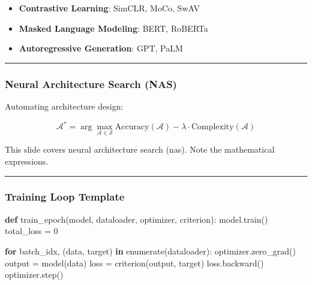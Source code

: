 \documentclass[
  letterpaper,
  DIV=11,
  numbers=noendperiod]{scrartcl}
\newenvironment{Shaded}{\begin{snugshade}}{\end{snugshade}}
\newcommand{\BuiltInTok}[1]{\textcolor[rgb]{0.00,0.23,0.31}{#1}}
\newcommand{\ControlFlowTok}[1]{\textcolor[rgb]{0.00,0.23,0.31}{\textbf{#1}}}
\newcommand{\DecValTok}[1]{\textcolor[rgb]{0.68,0.00,0.00}{#1}}
\newcommand{\KeywordTok}[1]{\textcolor[rgb]{0.00,0.23,0.31}{\textbf{#1}}}
\newcommand{\NormalTok}[1]{\textcolor[rgb]{0.00,0.23,0.31}{#1}}
\newcommand{\OperatorTok}[1]{\textcolor[rgb]{0.37,0.37,0.37}{#1}}
\providecommand{\tightlist}{%
  \setlength{\itemsep}{0pt}\setlength{\parskip}{0pt}}
\begin{document}
\begin{itemize}
\tightlist
\item
  \textbf{Contrastive Learning}: SimCLR, MoCo, SwAV
\item
  \textbf{Masked Language Modeling}: BERT, RoBERTa
\item
  \textbf{Autoregressive Generation}: GPT, PaLM
\end{itemize}

\begin{center}\rule{0.5\linewidth}{0.5pt}\end{center}

\subsubsection{Neural Architecture Search
(NAS)}\label{neural-architecture-search-nas}

Automating architecture design:

\[\mathcal{A}^* = \arg\max_{\mathcal{A} \in \mathcal{S}} \text{Accuracy}(\mathcal{A}) - \lambda \cdot \text{Complexity}(\mathcal{A})\]

This slide covers neural architecture search (nas). Note the
mathematical expressions.

\begin{center}\rule{0.5\linewidth}{0.5pt}\end{center}

\subsubsection{Training Loop Template}\label{training-loop-template}

\begin{Shaded}
\begin{Highlighting}[]
\KeywordTok{def}\NormalTok{ train\_epoch(model, dataloader, optimizer, criterion):}
\NormalTok{    model.train()}
\NormalTok{    total\_loss }\OperatorTok{=} \DecValTok{0}
    
    \ControlFlowTok{for}\NormalTok{ batch\_idx, (data, target) }\KeywordTok{in} \BuiltInTok{enumerate}\NormalTok{(dataloader):}
\NormalTok{        optimizer.zero\_grad()}
\NormalTok{        output }\OperatorTok{=}\NormalTok{ model(data)}
\NormalTok{        loss }\OperatorTok{=}\NormalTok{ criterion(output, target)}
\NormalTok{        loss.backward()}
\NormalTok{        optimizer.step()}
\end{Highlighting}
\end{Shaded}
\end{document}
